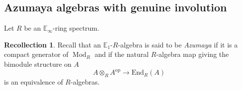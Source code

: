 \documentclass{article}
\DeclareMathOperator{\Mod}{Mod} %
\newcommand{\EE}{\mathbb{E}}
\theoremstyle{definition}
\newtheorem{recollection}[equation]{Recollection}
\begin{document}
\subsection{Azumaya algebras with genuine involution}
Let $ R $ be an $ \EE_\infty $-ring spectrum. 
\begin{recollection}\label{rec:Azumaya_alg_wo_involution} 
    Recall \cites{MR2927172,MR3190610} that an $ \EE_1 $-$ R $-algebra is said to be \emph{Azumaya} if it is a compact generator of $ \Mod_R $ and if the natural $ R $-algebra map giving the bimodule structure on $ A $
    \begin{equation*}
        A \otimes_R A^{\mathrm{op}} \to \mathrm{End}_R(A)
    \end{equation*}
    is an equivalence of $ R $-algebras. 
\end{recollection}
\end{document}
